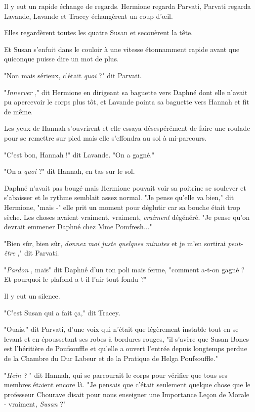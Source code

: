 Il y eut un rapide échange de regards. Hermione regarda Parvati, Parvati regarda Lavande, Lavande et Tracey échangèrent un coup d'œil.

Elles regardèrent toutes les quatre Susan et secouèrent la tête.

Et Susan s'enfuit dans le couloir à une vitesse étonnamment rapide avant que quiconque puisse dire un mot de plus.

"Non mais sérieux, c'était \emph{quoi}  ?" dit Parvati.

"\emph{Innerver} ," dit Hermione en dirigeant sa baguette vers Daphné dont elle n'avait pu apercevoir le corps plus tôt, et Lavande pointa sa baguette vers Hannah et fit de même.

Les yeux de Hannah s'ouvrirent et elle essaya désespérément de faire une roulade pour se remettre sur pied mais elle s'effondra au sol à mi-parcours.

"C'est bon, Hannah !" dit Lavande. "On a gagné."

"On a \emph{quoi}  ?" dit Hannah, en tas sur le sol.

Daphné n'avait pas bougé mais Hermione pouvait voir sa poitrine se soulever et s'abaisser et le rythme semblait assez normal. "Je pense qu'elle va bien," dit Hermione, "mais -" elle prit un moment pour déglutir car sa bouche était trop sèche. Les choses avaient vraiment, vraiment, \emph{vraiment}  dégénéré. "Je pense qu'on devrait emmener Daphné chez Mme Pomfresh..."

"Bien sûr, bien sûr, \emph{donnez moi juste quelques minutes}  et je m'en sortirai \emph{peut-être} ," dit Parvati.

"\emph{Pardon} , mais" dit Daphné d'un ton poli mais ferme, "comment a-t-on gagné ? Et pourquoi le plafond a-t-il l'air tout fondu ?"

Il y eut un silence.

"C'est Susan qui a fait ça," dit Tracey.

"Ouais," dit Parvati, d'une voix qui n'était que légèrement instable tout en se levant et en époussetant ses robes à bordures rouges, "il s'avère que Susan Bones est l'héritière de Poufsouffle et qu'elle a ouvert l'entrée depuis longtemps perdue de la Chambre du Dur Labeur et de la Pratique de Helga Poufsouffle."

"\emph{Hein ?} " dit Hannah, qui se parcourait le corps pour vérifier que tous ses membres étaient encore là. "Je pensais que c'était seulement quelque chose que le professeur Chourave disait pour nous enseigner une Importance Leçon de Morale - vraiment, \emph{Susan}  ?"

